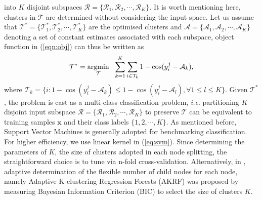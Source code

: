 \documentclass{tutmscthesis}[2010/09/22]
\numberwithin{equation}{section}
\numberwithin{table}{section}
\numberwithin{figure}{section}
\renewcommand{\vec}[1]{\bm{#1}}
\newcommand{\argmin}{\operatornamewithlimits{argmin}}
\def\onedot{. }
\def\ie{\emph{i.e}\onedot} \def\Ie{\emph{I.e}\onedot}
\begin{document}
into $K$ disjoint subspaces
$\mathcal{R} = \{\mathcal{R}_1, \mathcal{R}_2,\cdots,\mathcal{R}_K\}$.  
It is worth mentioning here, clusters in $\mathcal{T}$ are determined
without considering the input space. %
Let us assume that $\mathcal{T}^* = \{\mathcal{T}_1^*,
\mathcal{T}_2^*, \cdots, \mathcal{T}_K^*\}$ are the optimised clusters
and  $\mathcal{A} = \{\mathcal{A}_1, \mathcal{A}_2, \cdots,
\mathcal{A}_K\}$ denoting a set of constant estimates associated with
each subspace, object function in (\ref{eqn:obj}) can thus be written
as  
\begin{equation}
\mathcal{T}^* = \argmin_{\mathcal{T}} ~~\sum_{k=1}^K\sum_{i\in \mathcal{T}_k} 1 - \cos(y_i^j-\mathcal{A}_k),\label{eqn:obj_circular}
\end{equation}
where $\mathcal{T}_k=\{i: 1- \cos(y_i^j-\mathcal{A}_k)\leqslant 1- \cos(y_i^j-\mathcal{A}_l), \forall 1\leqslant l \leqslant K \}$. 
Given $\mathcal{T}^*$, the problem is cast as a multi-class
classification problem, \ie partitioning $K$ disjoint input subspace
$\mathcal{R} = \{\mathcal{R}_1, \mathcal{R}_2,\cdots, \mathcal{R}_K\}$
to preserve $\mathcal{T}$ can be equivalent to training samples
$\vec{x}$ and their class labels $\{1,2,\cdots, K\}$. As mentioned
before, Support Vector Machines is generally adopted for benchmarking
classification.  
For higher efficiency, we use linear kernel in (\ref{eq:svm}). 
Since determining the parameters of $K$, the size of clusters adopted
in each node splitting, the straightforward choice is to tune via
n-fold cross-validation. Alternatively, in  \cite{hara2014growing},
adaptive determination of the flexible number of child nodes for each
node, namely Adaptive K-clustering Regression Forests (AKRF) was
proposed by measuring Bayesian Information Criterion (BIC)
\cite{kashyap1977bayesian,schwarz1978estimating} to select the size of
clusters $K$. 
\end{document}
